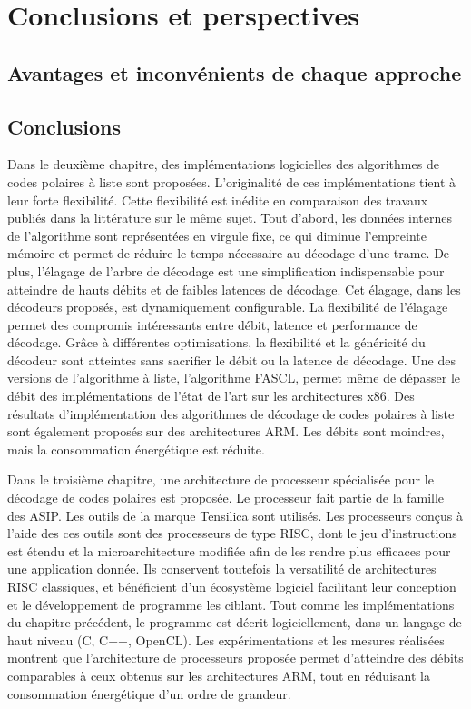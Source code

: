 \chapter*{Conclusions et perspectives}

\section*{Avantages et inconvénients de chaque approche}
\section*{Conclusions}
Dans le deuxième chapitre, des implémentations logicielles des algorithmes de codes polaires à liste sont proposées. L'originalité de ces implémentations tient à leur forte flexibilité. Cette flexibilité est inédite en comparaison des travaux publiés dans la littérature sur le même sujet. Tout d'abord, les données internes de l'algorithme sont représentées en virgule fixe, ce qui diminue l'empreinte mémoire et permet de réduire le temps nécessaire au décodage d'une trame. De plus, l'élagage de l'arbre de décodage est une simplification indispensable pour atteindre de hauts débits et de faibles latences de décodage. Cet élagage, dans les décodeurs proposés, est dynamiquement configurable. La flexibilité de l'élagage permet des compromis intéressants entre débit, latence et performance de décodage. Grâce à différentes optimisations, la flexibilité et la généricité du décodeur sont atteintes sans sacrifier le débit ou la latence de décodage. Une des versions de l'algorithme à liste, l'algorithme FASCL, permet même de dépasser le débit des implémentations de l'état de l'art sur les architectures x86. Des résultats d'implémentation des algorithmes de décodage de codes polaires à liste sont également proposés sur des architectures ARM. Les débits sont moindres, mais la consommation énergétique est réduite.

Dans le troisième chapitre, une architecture de processeur spécialisée pour le décodage de codes polaires est proposée. Le processeur fait partie de la famille des ASIP. Les outils de la marque Tensilica sont utilisés. Les processeurs conçus à l'aide des ces outils sont des processeurs de type RISC, dont le jeu d'instructions est étendu et la microarchitecture modifiée afin de les rendre plus efficaces pour une application donnée. Ils conservent toutefois la versatilité de architectures RISC classiques, et bénéficient d'un écosystème logiciel facilitant leur conception et le développement de programme les ciblant. Tout comme les implémentations du chapitre précédent, le programme est décrit logiciellement, dans un langage de haut niveau (C, C++, OpenCL). Les expérimentations et les mesures réalisées montrent que l'architecture de processeurs proposée permet d'atteindre des débits comparables à ceux obtenus sur les architectures ARM, tout en réduisant la consommation énergétique d'un ordre de grandeur.

